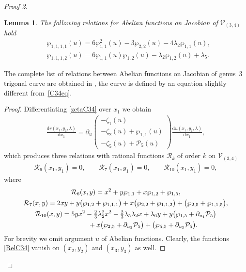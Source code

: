 \documentclass[pdftex]{sigma}
\numberwithin{equation}{section}
\newtheorem{Lemma}[Theorem]{Lemma}
\newcommand{\rmd}{\mathrm{d}}
\begin{document}
\begin{proof}[Proof 2]
\begin{Lemma}\label{L:ind4WPC34}
The following relations for Abelian functions on Jacobian of $\mathcal{V}_{(3,4)}$ hold
\begin{subequations}\label{C34WP4rel}
\begin{align}
 &\wp_{1,1,1,1}(u) = 6 \wp_{1,1}^2(u)-3\wp_{2,2}(u) - 4 \lambda_2 \wp_{1,1}(u),\label{wp1111RelC34} \\
 &\wp_{1,1,1,2}(u) = 6\wp_{1,1}(u)\wp_{1,2}(u) - \lambda_2 \wp_{1,2}(u) + \lambda_5. \label{wp1112RelC34}
\end{align}
\end{subequations}
\end{Lemma}
\begin{Remark} The complete list of relations between Abelian functions on Jacobian of genus~$3$ trigonal curve are obtained in \cite{Eilb2011}, the curve is defined by an equation slightly different from~\eqref{C34eq}.
\end{Remark}
\begin{proof}Differentiating \eqref{zetaC34} over $x_1$ we obtain
\begin{gather*}
 \frac{\rmd r(x_1,y_1,\lambda)}{\rmd x_1} = \partial_{u} \begin{pmatrix}
 -\zeta_1(u) \\
 -\zeta_2(u) + \wp_{1,1}(u)\\
 -\zeta_5(u) + \mathcal{P}_5(u) \end{pmatrix} \frac{\rmd u(x_1,y_1,\lambda)}{\rmd x_1},
\end{gather*}
which produces three relations with rational functions $\mathcal{R}_k$ of order $k$ on $\mathcal{V}_{(3,4)}$
\begin{gather*}
 \mathcal{R}_6(x_1,y_1) = 0, \qquad \mathcal{R}_7(x_1,y_1) = 0, \qquad \mathcal{R}_{10}(x_1,y_1) = 0,
\end{gather*}
where
\begin{subequations}\label{RelC34}
 \begin{gather}
 \mathcal{R}_6(x,y) = x^2 + y \wp_{1,1} + x \wp_{1,2} + \wp_{1,5},\label{R6RelC34}\\
 \mathcal{R}_7(x,y) = 2 x y + y \big(\wp_{1,2} + \wp_{1,1,1}\big) + x \big(\wp_{2,2} + \wp_{1,1,2}\big)
 + \big(\wp_{2,5} + \wp_{1,1,5}\big), \label{R7RelC34}\\
 \mathcal{R}_{10}(x,y) = 5 y x^2 - \tfrac{2}{3} \lambda_2^2 x^2 - \tfrac{2}{3} \lambda_5 \lambda_2 x + \lambda_6 y + y \big(\wp_{1,5} + \partial_{u_1} \mathcal{P}_5\big) \notag\\
\hphantom{\mathcal{R}_{10}(x,y) =}{} + x \big(\wp_{2,5} + \partial_{u_2} \mathcal{P}_5\big) + \big(\wp_{5,5} + \partial_{u_5} \mathcal{P}_5\big).\label{R10RelC34}
 \end{gather}
\end{subequations}
For brevity we omit argument $u$ of Abelian functions. Clearly, the functions \eqref{RelC34} vanish on $(x_2,y_2)$ and $(x_3,y_3)$ as well.


\end{proof}
\end{proof}
\end{document}
